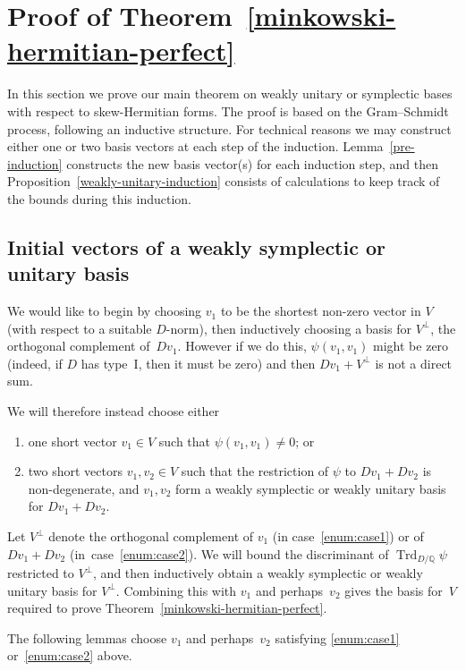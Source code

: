 \documentclass[11pt]{article}
\numberwithin{equation}{section}
\newcommand{\bQ}{\mathbb{Q}}
\DeclareMathOperator{\Trd}{Trd}
\begin{document}
\section{Proof of Theorem~\ref{minkowski-hermitian-perfect}} \label{sec:minkowski-proof}

In this section we prove our main theorem on weakly unitary or symplectic bases with respect to skew-Hermitian forms.
The proof is based on the Gram--Schmidt process, following an inductive structure.
For technical reasons we may construct either one or two basis vectors at each step of the induction.
Lemma~\ref{pre-induction} constructs the new basis vector(s) for each induction step, and then Proposition~\ref{weakly-unitary-induction} consists of calculations to keep track of the bounds during this induction.

\subsection{Initial vectors of a weakly symplectic or unitary basis}

We would like to begin by choosing $v_1$ to be the shortest non-zero vector in $V$ (with respect to a suitable $D$-norm), then inductively choosing a basis for $V^\perp$, the orthogonal complement of~$Dv_1$.
However if we do this, $\psi(v_1, v_1)$ might be zero (indeed, if $D$ has type~I, then it must be zero) and then $Dv_1 + V^\perp$ is not a direct sum.

We will therefore instead choose either
\begin{enumerate}
\item\label{enum:case1} one short vector $v_1 \in V$ such that $\psi(v_1, v_1) \neq 0$; or
\item\label{enum:case2} two short vectors $v_1, v_2 \in V$ such that the restriction of $\psi$ to $Dv_1 + Dv_2$ is non-degenerate, and $v_1, v_2$ form a weakly symplectic or weakly unitary basis for $Dv_1 + Dv_2$.
\end{enumerate}

Let $V^\perp$ denote the orthogonal complement of $v_1$ (in case~\eqref{enum:case1}) or of $Dv_1 + Dv_2$ (in~case~\eqref{enum:case2}).
We will bound the discriminant of $\Trd_{D/\bQ} \psi$ restricted to $V^\perp$, and then inductively obtain a weakly symplectic or weakly unitary basis for $V^\perp$.
Combining this with $v_1$ and perhaps~$v_2$ gives the basis for~$V$ required to prove Theorem~\ref{minkowski-hermitian-perfect}.

The following lemmas choose $v_1$ and perhaps~$v_2$ satisfying \eqref{enum:case1} or~\eqref{enum:case2} above.
\end{document}
